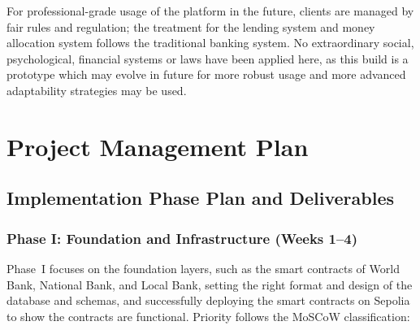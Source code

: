 For professional-grade usage of the platform in the future, clients are managed by fair rules and regulation; the treatment for the lending system and money allocation system follows the traditional banking system. No extraordinary social, psychological, financial systems or laws have been applied here, as this build is a prototype which may evolve in future for more robust usage and more advanced adaptability strategies may be used.

\section{Project Management Plan}
\label{sec:project-management-plan}

\subsection{Implementation Phase Plan and Deliverables}
\label{sec:impl-phase-plan}

\subsubsection{Phase I: Foundation and Infrastructure (Weeks 1--4)}

Phase~I focuses on the foundation layers, such as the smart contracts of World Bank, National Bank, and Local Bank, setting the right format and design of the database and schemas, and successfully deploying the smart contracts on Sepolia to show the contracts are functional. Priority follows the MoSCoW classification:

